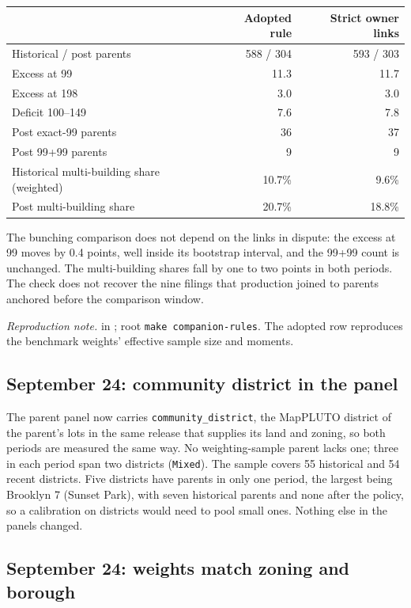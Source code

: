 \begin{center}
\small
\begin{tabular}{lrr}
\hline
& Adopted rule & Strict owner links \\
\hline
Historical / post parents & 588 / 304 & 593 / 303 \\
Excess at 99 & 11.3 & 11.7 \\
Excess at 198 & 3.0 & 3.0 \\
Deficit 100--149 & 7.6 & 7.8 \\
Post exact-99 parents & 36 & 37 \\
Post 99+99 parents & 9 & 9 \\
Historical multi-building share (weighted) & 10.7\% & 9.6\% \\
Post multi-building share & 20.7\% & 18.8\% \\
\hline
\end{tabular}
\end{center}

The bunching comparison does not depend on the links in dispute: the excess at
99 moves by 0.4 points, well inside its bootstrap interval, and the 99+99 count
is unchanged. The multi-building shares fall by one to two points in both
periods. The check does not recover the nine filings that production joined
to parents anchored before the comparison window.

\textit{Reproduction note.}  in
; root \texttt{make companion-rules}. The adopted
row reproduces the benchmark weights' effective sample size and moments.

\subsection*{September 24: community district in the panel}

The parent panel now carries \texttt{community\_district}, the MapPLUTO
district of the parent's lots in the same release that supplies its land and
zoning, so both periods are measured the same way. No weighting-sample parent
lacks one; three in each period span two districts (\texttt{Mixed}). The
sample covers 55 historical and 54 recent districts. Five districts have
parents in only one period, the largest being Brooklyn 7 (Sunset Park), with
seven historical parents and none after the policy, so a calibration on
districts would need to pool small ones. Nothing else in the panels changed.

\subsection*{September 24: weights match zoning and borough}

